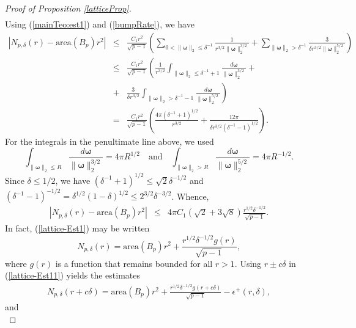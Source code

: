 \documentclass{amsart}
\numberwithin{equation}{section}
\begin{document}
\begin{proof}[Proof of Proposition \ref{latticeProp}]
\begin{eqnarray}
\end{eqnarray}
Using (\ref{mainTeo:est1}) and (\ref{bumpRate}), we have
\begin{eqnarray}
    \nonumber    
    |N_{p,\delta}(r)-\text{area}(B_p) r^2|&\le&
    \frac{C_1r^2}{\sqrt{p-1}}\left(\sum_{0<\|\boldsymbol{\omega}\|_2\le\delta^{-1}}\frac{1}{r^{3/2}\|\boldsymbol{\omega}\|_2^{3/2}}+\sum_{\|\boldsymbol{\omega}\|_2>\delta^{-1}}\frac{3}{\delta r^{3/2}\|\boldsymbol{\omega}\|_2^{5/2}}\right)\\
    \nonumber
    &\le&\frac{C_1r^2}{\sqrt{p-1}}\left(\frac{1}{r^{3/2}}\int_{\|\boldsymbol{\omega}\|_2\le\delta^{-1}+1}\frac{d\boldsymbol{\omega}}{\|\boldsymbol{\omega}\|^{3/2}_2}+\right.\\
    \nonumber
    &+&\left.\frac{3}{\delta r^{3/2}}\int_{\|\boldsymbol{\omega}\|_2>\delta^{-1}-1}\frac{d\boldsymbol{\omega}}{\|\boldsymbol{\omega}\|^{5/2}_2}\right)\\
    \nonumber
    &=&\frac{C_1r^2}{\sqrt{p-1}}\left(\frac{4\pi(\delta^{-1}+1)^{1/2}}{r^{3/2}}+\frac{12\pi}{\delta r^{3/2}(\delta^{-1}-1)^{1/2}}\right).
\end{eqnarray}
For the integrals in the penultimate line above, we used
$$
\int_{\|\boldsymbol{\omega}\|_2\le R}\frac{d\boldsymbol{\omega}}{\|\boldsymbol{\omega}\|^{3/2}_2}=4\pi R^{1/2}\quad\text{and}\quad\int_{\|\boldsymbol{\omega}\|_2>R}\frac{d\boldsymbol{\omega}}{\|\boldsymbol{\omega}\|^{5/2}_2}=4\pi R^{-1/2}.
$$
Since $\delta\le1/2$, we have $(\delta^{-1}+1)^{1/2}\le\sqrt{2}\delta^{-1/2}$ and $(\delta^{-1}-1)^{-1/2}=\delta^{1/2}(1-\delta)^{1/2}\le 2^{3/2}\delta^{-3/2}$. Whence,
\begin{eqnarray}
    \label{lattice-Est1}
    |N_{p,\delta}(r)-\text{area}(B_p) r^2|&\le&4\pi C_1\left(\sqrt{2}+3\sqrt{8}\right)\frac{r^{1/2}\delta^{-1/2}}{\sqrt{p-1}}.
\end{eqnarray}
In fact, (\ref{lattice-Est1}) may be written
\begin{equation}
    \label{lattice-Est11}
    N_{p,\delta}(r)=\text{area}(B_p) r^2+\frac{r^{1/2}\delta^{-1/2}g(r)}{\sqrt{p-1}},
\end{equation}
where $g(r)$ is a function that remains bounded for all $r>1$. 
Using $r\pm c\delta$ in (\ref{lattice-Est11}) yields the estimates
\begin{eqnarray}
    \label{lattice-Est21}
    N_{p,\delta}(r+c\delta)=\text{area}(B_p) r^2+\frac{r^{1/2}\delta^{-1/2}g(r+c\delta)}{\sqrt{p-1}}-\epsilon^+(r,\delta),
\end{eqnarray}
and
\begin{equation}

\end{equation}
\end{proof}
\end{document}
